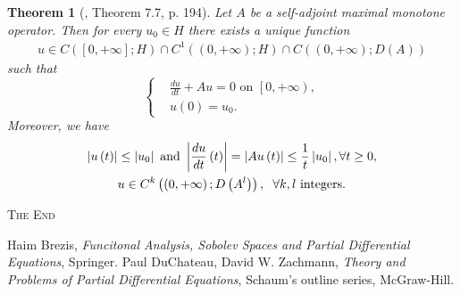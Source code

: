 \documentclass[11pt,a4paper]{article}
\numberwithin{equation}{section}
\numberwithin{equation}{section}
\newtheorem{theorem}{Theorem}[section]
\begin{document}
\begin{theorem}[\cite{Haim}, Theorem 7.7, p. 194]
Let $A$ be a self-adjoint maximal monotone operator. Then for every $u_0\in H$ there exists a unique function
\begin{align}
u \in C\left( {\left[ {0, + \infty } \right];H} \right) \cap {C^1}\left( {\left( {0, + \infty } \right);H} \right) \cap C\left( {\left( {0, + \infty } \right);D\left( A \right)} \right)
\end{align}
such that
\begin{equation}
\left\{ \begin{split}
& \frac{{du}}{{dt}} + Au = 0 \mbox{ on } \left[ {0, + \infty } \right),\\
& u\left( 0 \right) = {u_0}.
\end{split} \right.
\end{equation}
Moreover, we have
\begin{align}
\left| {u\left( t \right)} \right| &\le \left| {{u_0}} \right| \mbox{ and } \left| {\frac{{du}}{{dt}}\left( t \right)} \right| = \left| {Au\left( t \right)} \right| \le \frac{1}{t}\left| {{u_0}} \right|,\forall t \ge 0,\\
& u \in {C^k}\left( {\left( {0, + \infty } \right);D\left( {{A^l}} \right)} \right),\hspace{0.2cm}\forall k,l \mbox{ integers}.
\end{align}
\end{theorem}
\vspace{1cm}
\begin{center}
\textsc{The End}
\end{center}
\newpage
\begin{thebibliography}{99}
 Haim Brezis, \textit{Funcitonal Analysis, Sobolev Spaces and Partial Differential Equations}, Springer.
 Paul DuChateau, David W. Zachmann, \textit{Theory and Problems of Partial Differential Equations}, Schaum's outline series, McGraw-Hill.
\end{thebibliography}

\end{document}
